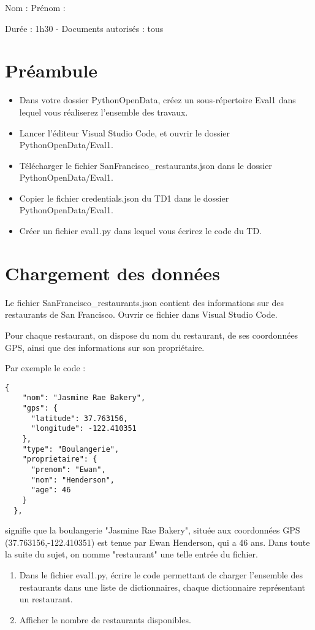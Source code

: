 \documentclass[11pt,a4paper]{article}
\begin{document}
\normalsize \normalfont Nom : \dotfill \hspace{4cm}
  Prénom : \dotfill

Durée : 1h30 - Documents autorisés : tous

\section*{Préambule}
\begin{itemize}
    \item Dans votre dossier PythonOpenData, créez un sous-répertoire Eval1 dans lequel vous réaliserez l'ensemble des travaux.
    \item Lancer l'éditeur Visual Studio Code, et ouvrir le dossier PythonOpenData/Eval1. 
    \item Télécharger le fichier SanFrancisco\_restaurants.json dans le dossier PythonOpenData/Eval1.
  \item Copier le fichier credentials.json du TD1 dans le dossier PythonOpenData/Eval1.
  \item Créer un fichier eval1.py dans lequel vous écrirez le code du TD. 
\end{itemize}

\section{Chargement des données}

Le fichier SanFrancisco\_restaurants.json contient des informations sur des restaurants de San Francisco. Ouvrir ce fichier dans Visual Studio Code.

Pour chaque restaurant, on dispose du nom du restaurant, de ses coordonnées GPS, ainsi que des informations
sur son propriétaire. 

Par exemple le code : 
\begin{verbatim}
{
    "nom": "Jasmine Rae Bakery",
    "gps": {
      "latitude": 37.763156,
      "longitude": -122.410351
    },
    "type": "Boulangerie",
    "proprietaire": {
      "prenom": "Ewan",
      "nom": "Henderson",
      "age": 46
    }
  },
\end{verbatim}
signifie que la boulangerie "Jasmine Rae Bakery", située aux coordonnées GPS (37.763156,-122.410351) 
est tenue par Ewan Henderson, qui a 46 ans. Dans toute la suite du sujet, on nomme "restaurant" une telle entrée du fichier.



\begin{enumerate}
\item Dans le fichier eval1.py, écrire le code permettant de charger l'ensemble des restaurants dans une liste de dictionnaires, chaque dictionnaire représentant un restaurant. 
\item Afficher le nombre de restaurants disponibles.
\end{enumerate}
\newpage
\end{document}

